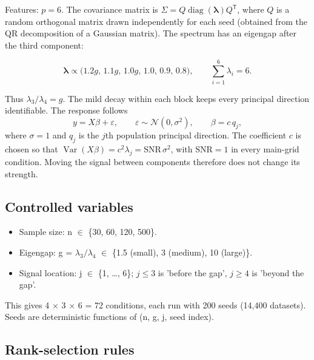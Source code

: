 \documentclass[11pt]{article}
\begin{document}
Features: $p=6$. The covariance matrix is $\Sigma=Q\operatorname{diag}(\boldsymbol\lambda)Q^{\mathsf T}$, where $Q$ is a random orthogonal matrix drawn independently for each seed (obtained from the QR decomposition of a Gaussian matrix). The spectrum has an eigengap after the third component:

\begin{equation}
\boldsymbol\lambda \propto \bigl(1.2g,\,1.1g,\,1.0g,\,1.0,\,0.9,\,0.8\bigr),\qquad \sum_{i=1}^{6}\lambda_i=6.
\end{equation}

Thus $\lambda_3/\lambda_4=g$. The mild decay within each block keeps every principal direction identifiable. The response follows
\begin{equation}
y=X\beta+\varepsilon,\qquad \varepsilon\sim\mathcal N(0,\sigma^2),\qquad \beta=c\,q_j,
\end{equation}
where $\sigma=1$ and $q_j$ is the $j$th population principal direction. The coefficient $c$ is chosen so that $\operatorname{Var}(X\beta)=c^2\lambda_j=\mathrm{SNR}\,\sigma^2$, with $\mathrm{SNR}=1$ in every main-grid condition. Moving the signal between components therefore does not change its strength.

\subsection{Controlled variables}

\begin{itemize}

\item Sample size: n $\in$ \{30, 60, 120, 500\}.

\item Eigengap: g = $\lambda_3/\lambda_4$ $\in$ \{1.5 (small), 3 (medium), 10 (large)\}.

\item Signal location: j $\in$ \{1, \ldots{}, 6\}; $j\leq 3$ is 'before the gap', $j\geq 4$ is 'beyond the gap'.

\end{itemize}

This gives 4 $\times$ 3 $\times$ 6 = 72 conditions, each run with 200 seeds (14,400 datasets). Seeds are deterministic functions of (n, g, j, seed index).\par

\subsection{Rank-selection rules}
\end{document}
